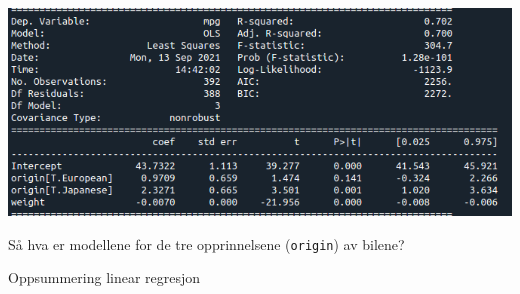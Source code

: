 \documentclass[10pt,ignorenonframetext,]{beamer}
\begin{document}
\begin{frame}[fragile]

\includegraphics{kategorisk_variabel.png}

\vspace{2mm}

Så hva er modellene for de tre opprinnelsene (\texttt{origin}) av
bilene?

\end{frame}

\begin{frame}

\begin{block}{Oppsummering linear regresjon}

\end{block}

\end{frame}
\end{document}
